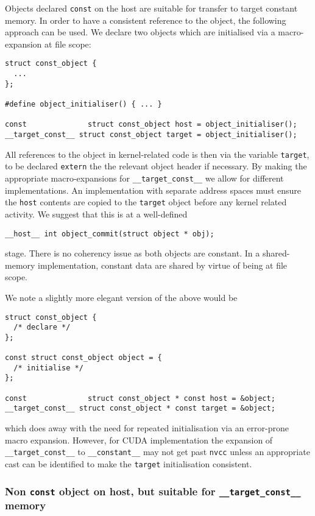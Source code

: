Objects declared \texttt{const} on the host are suitable for transfer
to target constant memory. In order to have a consistent reference
to the object, the following approach can be used. We declare two
objects which are initialised via a macro-expansion at file scope:

\begin{lstlisting}
struct const_object {
  ...
};

#define object_initialiser() { ... }

const              struct const_object host = object_initialiser();
__target_const__ struct const_object target = object_initialiser();
\end{lstlisting}
All references to the object in kernel-related code is then via the
variable \texttt{target}, to be declared \texttt{extern} the the
relevant object header if necessary.
By making the appropriate macro-expansions for \texttt{\_\_target\_const\_\_}
we allow for different implementations. An implementation with separate
address spaces must ensure the \texttt{host}
contents are copied to the \texttt{target} object before any kernel
related activity. We suggest that this is at a well-defined
\begin{lstlisting}
__host__ int object_commit(struct object * obj);
\end{lstlisting}
stage. There is no coherency issue as both objects are constant. In a
shared-memory implementation, constant data are shared by virtue of
being at file scope.

We note a slightly more elegant version of the above would be
\begin{lstlisting}
struct const_object {
  /* declare */
};

const struct const_object object = {
  /* initialise */
};

const              struct const_object * const host = &object;
__target_const__ struct const_object * const target = &object;
\end{lstlisting}
which does away with the need for repeated initialisation via
an error-prone macro expansion. However,
for CUDA implementation the expansion of \texttt{\_\_target\_const\_\_}
to \texttt{\_\_constant\_\_}
may not get past \texttt{nvcc} unless an appropriate cast can
be identified to make the \texttt{target} initialisation consistent.

\subsubsection{Non \texttt{const} object on host, but suitable for
\texttt{\_\_target\_const\_\_} memory}


